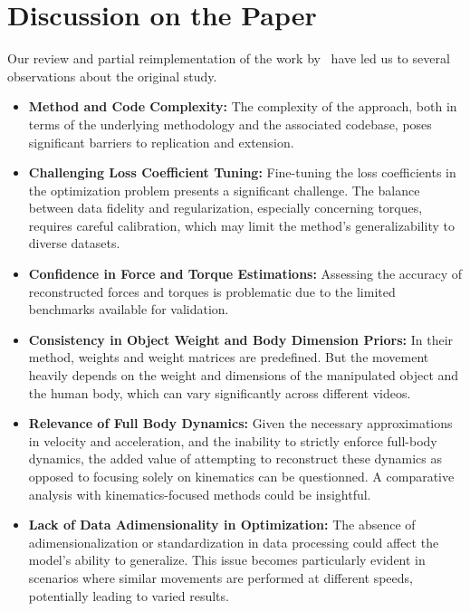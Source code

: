 \section{Discussion on the Paper}
\label{sec:discussion}

Our review and partial reimplementation of the work by~\citet{li2019estimating} have led us to several observations about 
the original study.

\begin{itemize}
    \item \textbf{Method and Code Complexity:} The complexity of the approach, both in terms of the underlying methodology and the associated 
    codebase, poses significant barriers to replication and extension.

    \item \textbf{Challenging Loss Coefficient Tuning:} Fine-tuning the loss coefficients in the optimization problem presents a significant 
    challenge. The balance between data fidelity and regularization, especially concerning torques, requires careful calibration, which may 
    limit the method's generalizability to diverse datasets. 

    \item \textbf{Confidence in Force and Torque Estimations:} Assessing the accuracy of reconstructed forces and torques is problematic due 
    to the limited benchmarks available for validation.

    \item \textbf{Consistency in Object Weight and Body Dimension Priors:} In their method, weights and weight matrices are predefined. 
    But the movement heavily depends on the weight and dimensions of the manipulated object and the human body, which can vary significantly 
    across different videos. 

    \item \textbf{Relevance of Full Body Dynamics:} Given the necessary approximations in velocity and acceleration, and the inability to 
    strictly enforce full-body dynamics, the added value of attempting to reconstruct these dynamics as opposed to focusing 
    solely on kinematics can be questionned. A comparative analysis with kinematics-focused methods could be insightful.

    \item \textbf{Lack of Data Adimensionality in Optimization:} The absence of adimensionalization or standardization in data processing could 
    affect the model's ability to generalize. This issue becomes particularly evident in scenarios where similar movements are performed at 
    different speeds, potentially leading to varied results.

\end{itemize}